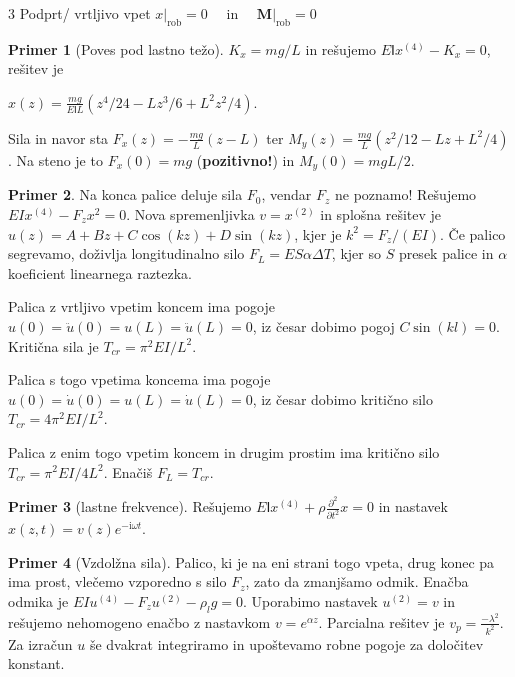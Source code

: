 \documentclass[10pt,landscape]{article}
\theoremstyle{definition}
\newtheorem*{primer}{Primer}
\begin{document}
\begin{multicols}{3}
  Podprt/ vrtljivo vpet \(  \left. x \right|_{\text{rob}} = 0 \quad \text{ in } \quad \left. \mathbf{M} \right|_{\text{rob}} = 0 \)

  \begin{primer}[Poves pod lastno težo]
    \( K_x = mg / L \) in rešujemo \( E \mathsf{I} x^{(4)} - K_x = 0 \), rešitev je

    \( x(z) = \frac{mg}{E\mathsf{I}L} \left( z^4 / 24 - L z ^3 / 6 + L ^2 z ^2 / 4 \right) \).

    Sila in navor sta \( F_x (z) = - \frac{mg}{L} (z - L ) \) ter \( M_y (z) = \frac{mg}{L} (z ^2 / 12 - Lz + L ^2/ 4) \). Na steno je to \( F_x (0) = mg \) (\textbf{pozitivno!}) in \( M_y (0) = mgL /2 \). 
  \end{primer}

  \begin{primer}
    Na konca palice deluje sila \( F_0 \), vendar \( F_z \) ne poznamo! Rešujemo \( E I x^{(4)} - F_z x^2 = 0 \). Nova spremenljivka \( v = x^{(2)} \) in splošna rešitev je \( u(z) = A + Bz + C \cos (kz) + D \sin(kz) \), kjer je \( k ^2 = F_z / (EI) \). Če palico segrevamo, doživlja longitudinalno silo \( F_L = E S \alpha \Delta T \), kjer so \( S \) presek palice in \( \alpha \) koeficient linearnega raztezka.

    Palica z vrtljivo vpetim koncem ima pogoje \( u(0) = \ddot{u}(0) = u(L) = \ddot{u}(L) = 0 \), iz česar dobimo pogoj \( C \sin (kl) = 0 \).  Kritična sila je \( T_{cr} = \pi ^2 EI / L ^2 \).

    Palica s togo vpetima koncema ima pogoje \( u(0) = \dot{u} (0) = u(L) = \dot{u}(L) = 0 \), iz česar dobimo kritično silo \( T_{cr} = 4 \pi ^2 EI / L ^2 \).

    Palica z enim togo vpetim koncem in drugim prostim ima kritično silo \( T_{cr} = \pi ^2 E I / 4 L ^2 \). Enačiš \( F_L = T_{cr} \).
  \end{primer}

  \begin{primer}[lastne frekvence]
    Rešujemo \( E \mathsf{I} x^{(4)} + \rho \frac{\partial ^2}{\partial t ^2} x = 0  \) in nastavek \( x(z, t) = v(z) e^{- \mathrm{i} \omega t} \).
  \end{primer}

  \begin{primer}[Vzdolžna sila]
    Palico, ki je na eni strani togo vpeta, drug konec pa ima prost, vlečemo vzporedno s silo \( F_z \), zato da zmanjšamo odmik. Enačba odmika je \( EI u^{(4)} - F_z u^{(2)} - \rho_l g = 0. \) Uporabimo  nastavek \( u^{(2)} = v \) in rešujemo nehomogeno enačbo z nastavkom \( v = e^{\alpha z} \). Parcialna rešitev je \( v_p = \frac{- \lambda ^2}{k ^2} \). Za izračun \( u \) še dvakrat integriramo in upoštevamo robne pogoje za določitev konstant.
  \end{primer}


\end{multicols}
\end{document}
